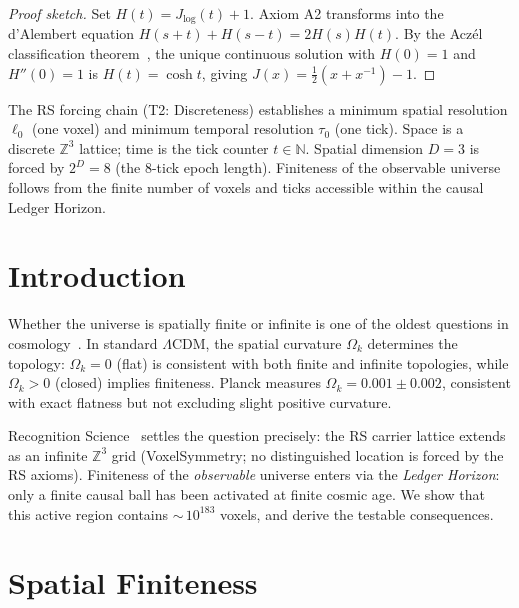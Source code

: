 \documentclass[12pt,a4paper]{article}
\theoremstyle{definition}
\theoremstyle{remark}
\begin{document}
\begin{proof}[Proof sketch]
Set $H(t) = J_{\log}(t)+1$.  Axiom A2 transforms into the d'Alembert
equation $H(s+t)+H(s-t)=2H(s)H(t)$.  By the Acz\'el classification
theorem~\cite{Aczel1966}, the unique continuous solution with $H(0)=1$
and $H''(0)=1$ is $H(t)=\cosh t$, giving
$J(x)=\tfrac{1}{2}(x+x^{-1})-1$.
\end{proof}

\noindent The RS forcing chain (T2: Discreteness) establishes a minimum
spatial resolution $\ell_0$ (one voxel) and minimum temporal resolution
$\tau_0$ (one tick).  Space is a discrete $\mathbb{Z}^3$ lattice;
time is the tick counter $t \in \mathbb{N}$.  Spatial dimension $D=3$
is forced by $2^D=8$ (the 8-tick epoch length).  Finiteness of the
observable universe follows from the finite number of voxels and ticks
accessible within the causal Ledger Horizon.

\section{Introduction}
\label{sec:intro}

Whether the universe is spatially finite or infinite is one of the
oldest questions in cosmology~\cite{Luminet2016}.  In standard
$\Lambda$CDM, the spatial curvature $\Omega_k$ determines the
topology: $\Omega_k = 0$ (flat) is consistent with both finite and
infinite topologies, while $\Omega_k > 0$ (closed) implies
finiteness.  Planck measures $\Omega_k = 0.001 \pm 0.002$, consistent
with exact flatness but not excluding slight positive curvature.

Recognition Science~\cite{RS_Axioms} settles the question precisely:
the RS carrier lattice extends as an infinite $\mathbb{Z}^3$ grid
(VoxelSymmetry; no distinguished location is forced by the RS axioms).
Finiteness of the \emph{observable} universe enters via the
\emph{Ledger Horizon}: only a finite causal ball has been activated
at finite cosmic age.  We show that this active region contains
${\sim}\,10^{183}$ voxels, and derive the testable consequences.

\section{Spatial Finiteness}
\label{sec:spatial}
\end{document}
